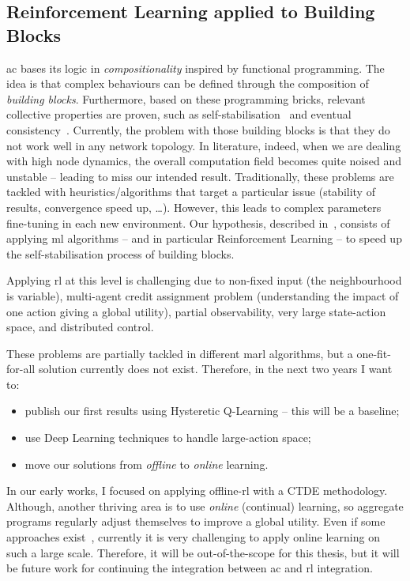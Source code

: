 \documentclass[11pt]{article}
\begin{document}
\subsection{Reinforcement Learning applied to Building Blocks}\label{rl-future}
\ac{ac} bases its logic in \textit{compositionality} inspired by functional programming. The idea is that complex behaviours can be defined through the composition of \emph{building blocks}. Furthermore, based on these programming bricks, relevant collective properties are proven, such as self-stabilisation~\cite{DBLP:journals/corr/abs-1711-08297} and eventual consistency~\cite{DBLP:conf/saso/BealVPD16}. 
%
Currently, the problem with those building blocks is that they do not work well in any network topology. In literature, indeed, when we are dealing with high node dynamics, the overall computation field becomes quite noised and unstable -- leading to miss our intended result.
%
Traditionally, these problems are tackled with heuristics/algorithms that target a particular issue (stability of results, convergence speed up, \dots{}). However, this leads to complex parameters fine-tuning in each new environment.
%
Our hypothesis, described in~\cite{research}, consists of applying \ac{ml} algorithms -- and in particular Reinforcement Learning --
to speed up the self-stabilisation process of building blocks.

Applying \ac{rl} at this level is challenging due to non-fixed input (the neighbourhood is variable), multi-agent credit assignment problem (understanding the impact of one action giving a global utility), partial observability, very large state-action space, and distributed control.

These problems are partially tackled in different \ac{marl} algorithms, but a one-fit-for-all solution currently does not exist. Therefore, in the next two years I want to:
\begin{itemize}
	\item publish our first results using Hysteretic Q-Learning -- this will be a baseline;
	\item use Deep Learning techniques to handle large-action space;
	\item move our solutions from \emph{offline} to \emph{online} learning. 
\end{itemize}
In our early works, I focused on applying offline-\ac{rl} with a CTDE methodology.
Although, another thriving area is to use \emph{online} (continual) learning, so aggregate programs regularly adjust themselves to improve a global utility. Even if some approaches exist~\cite{DBLP:conf/icml/OmidshafieiPAHV17}, currently it is very challenging to apply online learning on such a large scale. Therefore, it will be out-of-the-scope for this thesis, but it will be future work for continuing the integration between \ac{ac} and \ac{rl} integration. 
\end{document}
